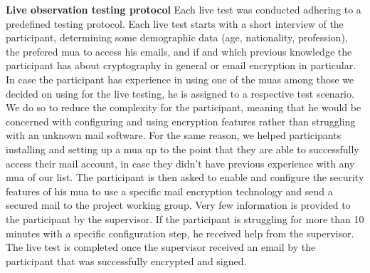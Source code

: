 \newline
\newline
\textbf{Live observation testing protocol}
\newline
Each live test was conducted adhering to a predefined testing protocol. Each live test starts with a short interview of the participant, determining some demographic data (age, nationality, profession), the prefered \acrshort{mua} to access his \acrshort{email}s, and if and which previous knowledge the participant has about cryptography in general or email encryption in particular. In case the participant has experience in using one of the \acrshort{mua}s among those we decided on using for the live testing, he is assigned to a respective test scenario. We do so to reduce the complexity for the participant, meaning that he would be concerned with configuring and using encryption features rather than struggling with an unknown mail software. For the same reason, we helped participants installing and setting up a \acrshort{mua} up to the point that they are able to successfully access their mail account, in case they didn’t have previous experience with any \acrshort{mua} of our list. The participant is then asked to enable and configure the security features of his \acrshort{mua} to use a specific mail encryption technology and send a secured mail to the project working group. Very few information is provided to the participant by the supervisor. If the participant is struggling for more than 10 minutes with a specific configuration step, he received help from the supervisor. The live test is completed once the supervisor received an \acrshort{email} by the participant that was successfully encrypted and signed.